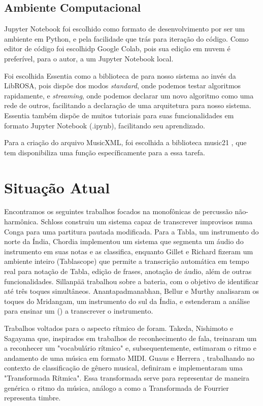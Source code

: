 \documentclass[
  dissertacao,
  brazil
]{ThesisPUC}
\begin{document}
\section{Ambiente Computacional}

Jupyter Notebook foi escolhido como formato de desenvolvimento por ser um ambiente em Python, e pela facilidade que trás para iteração do código. Como editor de código foi escolhidp Google Colab, pois sua edição em nuvem é preferível, para o autor, a um Jupyter Notebook local.

Foi escolhida Essentia como a biblioteca de \MIR\space para nosso sistema ao invés da LibROSA, pois dispõe dos modos \emph{standard}, onde podemos testar algoritmos rapidamente, e \emph{streaming}, onde podemos declarar um novo algoritmo como uma rede de outros, facilitando a declaração de uma arquitetura para nosso sistema. Essentia também dispõe de muitos tutoriais para suas funcionalidades em formato Jupyter Notebook (.ipynb), facilitando seu aprendizado.

Para a criação do arquivo MusicXML, foi escolhida a biblioteca music21 \cite{cuthbert2010music21}, que tem disponibiliza uma função específicamente para a essa tarefa.


\chapter{Situação Atual}

Encontramos os seguintes trabalhos focados na \TAM  monofônicas de percussão não-harmônica. Schloss \cite{schloss1986automatic} construiu um sistema capaz de transcrever improvisos numa Conga para uma partitura pautada modificada. Para a Tabla, um instrumento do norte da Índia, Chordia \cite{chordia2005segmentation} implementou um sistema que segmenta um áudio do instrumento em suas notas e as classifica, enquanto Gillet e Richard \cite{gillet2003automatic} fizeram um ambiente inteiro (Tablascope) que permite a transcrição automática em tempo real para notação de Tabla, edição de frases, anotação de áudio, além de outras funcionalidades. Sillanpää \cite{sillanpaa2000drum} trabalhou sobre a bateria, com o objetivo de identificar até três toques simultâneos. Anantapadmanabhan, Bellur e Murthy \cite{anantapadmanabhan2013modal} analisaram os toques do Mridangam, um instrumento do sul da Índia, e estenderam a análise para ensinar um \hmm (\HMM) a transcrever o instrumento. 

Trabalhos voltados para o aspecto rítmico de \TAM foram. Takeda, Nishimoto e Sagayama \cite{takeda2007rhythm} que, inspirados em trabalhos de reconhecimento de fala, treinaram um \HMM\space a reconhecer um "vocabulário rítmico" e, subsequentemente, estimaram o ritmo e andamento de uma música em formato MIDI.
Guaus e Herrera \cite{guaus2005rhythm}, trabalhando no contexto de classificação de gênero musical, definiram e implementaram uma "Transformada Rítmica". Essa transformada serve para representar de maneira genérica o ritmo da música, análogo a como a Transformada de Fourrier representa timbre.
\end{document}
